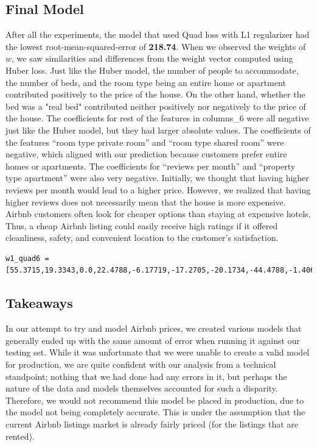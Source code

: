 \documentclass{article}
\begin{document}
\subsection{Final Model}
After all the experiments, the model that used Quad loss with L1 regularizer had the lowest root-mean-squared-error of \textbf{218.74}. When we observed the weights of $w$, we saw similarities and differences from the weight vector computed using Huber loss. Just like the Huber model, the number of people to accommodate, the number of beds, and the room type being an entire home or apartment contributed positively to the price of the house. On the other hand, whether the bed was a "real bed" contributed neither positively nor negatively to the price of the house. The coefficients for rest of the features in columns\_6 were all negative just like the Huber model, but they had larger absolute values. The coefficients of the features ``room type private room'' and ``room type shared room'' were negative, which aligned with our prediction because customers prefer entire homes or apartments. The coefficients for ``reviews per month'' and ``property type apartment'' were also very negative. Initially, we thought that having higher reviews per month would lead to a higher price. However, we realized that having higher reviews does not necessarily mean that the house is more expensive. Airbnb customers often look for cheaper options than staying at expensive hotels. Thus, a cheap Airbnb listing could easily receive high ratings if it offered cleanliness, safety, and convenient location to the customer's satisfaction.

\begin{verbatim}
w1_quad6 = [55.3715,19.3343,0.0,22.4788,-6.17719,-17.2705,-20.1734,-44.4788,-1.4063]
\end{verbatim}

\subsection{Takeaways}
In our attempt to try and model Airbnb prices, we created various models that generally ended up with the same amount of error when running it against our testing set. While it was unfortunate that we were unable to create a valid model for production, we are quite confident with our analysis from a technical standpoint; nothing that we had done had any errors in it, but perhaps the nature of the data and models themselves accounted for such a disparity. Therefore, we would not recommend this model be placed in production, due to the model not being completely accurate. This is under the assumption that the current Airbnb listings market is already fairly priced (for the listings that are rented).
\end{document}
